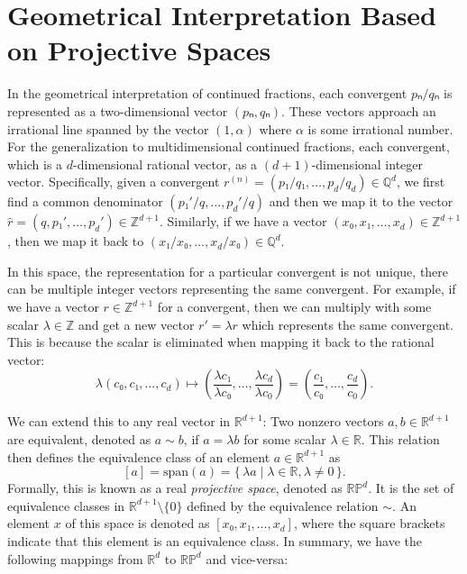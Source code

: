 \section{Geometrical Interpretation Based on Projective Spaces}
\label{sec:mdcf-geometry}

In the geometrical interpretation of continued fractions,
each convergent $pₙ/qₙ$ is represented as a two-dimensional vector $(pₙ, qₙ)$.
These vectors approach an irrational line spanned by the vector $(1, α)$
where $α$ is some irrational number.
For the generalization to multidimensional continued fractions,
each convergent, which is a $d$-dimensional rational vector,
as a $(d+1)$-dimensional integer vector.
Specifically, given a convergent $r^{(n)} = (p₁/q₁, …, p_d/q_d) ∈ ℚ^d$,
we first find a common denominator $(p₁'/q, …, p_d'/q)$ and
then we map it to the vector $\hat r = (q, p₁', …, p_d') ∈ ℤ^{d+1}$.
Similarly, if we have a vector $(x₀, x₁, …, x_d) ∈ ℤ^{d+1}$,
then we map it back to $(x₁/x₀, …, x_d/x₀) ∈ ℚ^d$.

In this space, the representation for a particular convergent is not unique,
there can be multiple integer vectors representing the same convergent.
For example, if we have a vector $r ∈ ℤ^{d+1}$ for a convergent,
then we can multiply with some scalar $λ ∈ ℤ$ and get a new vector $r' = λ r$
which represents the same convergent.
This is because the scalar is eliminated when mapping it back to the rational vector:
\[
  λ (c₀, c₁, …, c_d)
  ↦ \left(\frac{λ c₁}{λ c₀}, …, \frac{λ c_d}{λ c_0} \right)
  = \left(\frac{c₁}{c₀}, …, \frac{c_d}{c_0} \right).
\]

We can extend this to any real vector in $ℝ^{d+1}$:
Two nonzero vectors $a, b ∈ ℝ^{d+1}$ are equivalent,
denoted as $a \sim b$, if $a = λ b$ for some scalar $λ ∈ ℝ$.
This relation then defines the equivalence class of an element $a ∈ ℝ^{d+1}$ as
\[
  [a] = \mathrm{span}(a) = \{\, λ a \mid λ ∈ ℝ, λ ≠ 0 \,\}.
\]
Formally, this is known as a real \emph{projective space}, denoted as $\mathbb{RP}^d$.
It is the set of equivalence classes in $ℝ^{d+1} \setminus \{0\}$ defined by the
equivalence relation $\sim$.
An element $x$ of this space is denoted as $[x₀, x₁, …, x_d]$,
where the square brackets indicate that this element is an equivalence
class.
In summary, we have the following mappings from $ℝ^d$ to $\mathbb{RP}^d$
and vice-versa:

